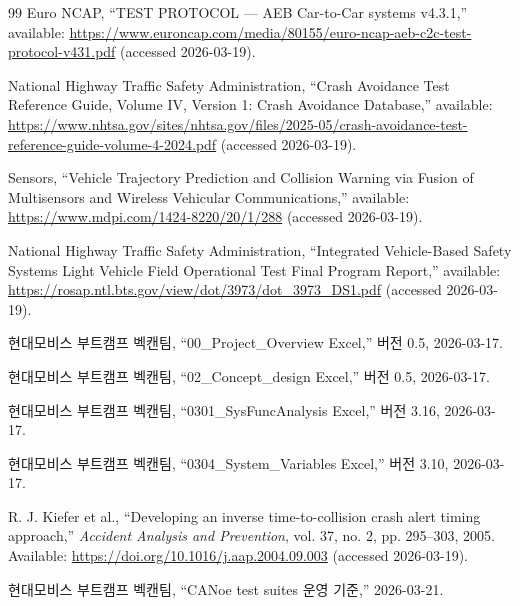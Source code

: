 \documentclass[11pt,a4paper]{article}
\begin{document}
\begin{thebibliography}{99}
Euro NCAP, ``TEST PROTOCOL --- AEB Car-to-Car systems v4.3.1,'' available: \url{https://www.euroncap.com/media/80155/euro-ncap-aeb-c2c-test-protocol-v431.pdf} (accessed 2026-03-19).

National Highway Traffic Safety Administration, ``Crash Avoidance Test Reference Guide, Volume IV, Version 1: Crash Avoidance Database,'' available: \url{https://www.nhtsa.gov/sites/nhtsa.gov/files/2025-05/crash-avoidance-test-reference-guide-volume-4-2024.pdf} (accessed 2026-03-19).

Sensors, ``Vehicle Trajectory Prediction and Collision Warning via Fusion of Multisensors and Wireless Vehicular Communications,'' available: \url{https://www.mdpi.com/1424-8220/20/1/288} (accessed 2026-03-19).

National Highway Traffic Safety Administration, ``Integrated Vehicle-Based Safety Systems Light Vehicle Field Operational Test Final Program Report,'' available: \url{https://rosap.ntl.bts.gov/view/dot/3973/dot_3973_DS1.pdf} (accessed 2026-03-19).

현대모비스 부트캠프 벡캔팀, ``00\_Project\_Overview Excel,'' 버전 0.5, 2026-03-17.

현대모비스 부트캠프 벡캔팀, ``02\_Concept\_design Excel,'' 버전 0.5, 2026-03-17.

현대모비스 부트캠프 벡캔팀, ``0301\_SysFuncAnalysis Excel,'' 버전 3.16, 2026-03-17.

현대모비스 부트캠프 벡캔팀, ``0304\_System\_Variables Excel,'' 버전 3.10, 2026-03-17.

R. J. Kiefer et al., ``Developing an inverse time-to-collision crash alert timing approach,'' \emph{Accident Analysis and Prevention}, vol. 37, no. 2, pp. 295--303, 2005. Available: \url{https://doi.org/10.1016/j.aap.2004.09.003} (accessed 2026-03-19).

현대모비스 부트캠프 벡캔팀, ``CANoe test suites 운영 기준,'' 2026-03-21.

\end{thebibliography}
\end{document}
